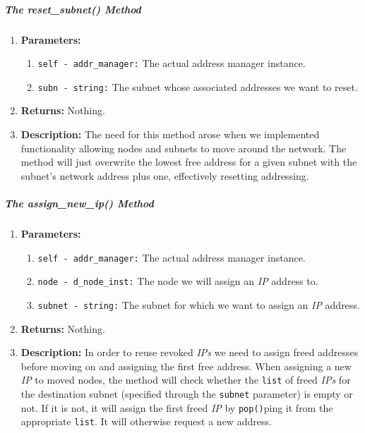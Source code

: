         \subparagraph{The reset\_subnet() Method}
            \begin{enumerate}
                \item \textbf{Parameters:}
                \begin{enumerate}
                    \item \texttt{self - addr\_manager:} The actual address manager instance.
                    \item \texttt{subn - string:} The subnet whose associated addresses we want to reset.
                \end{enumerate}
                \item \textbf{Returns:} Nothing.
                \item \textbf{Description:} The need for this method arose when we implemented functionality allowing nodes and subnets to move around the network. The method will just overwrite the lowest free address for a given subnet with the subnet's network address plus one, effectively resetting addressing.
            \end{enumerate}

        \subparagraph{The assign\_new\_ip() Method}
            \begin{enumerate}
                \item \textbf{Parameters:}
                \begin{enumerate}
                    \item \texttt{self - addr\_manager:} The actual address manager instance.
                    \item \texttt{node - d\_node\_inst:} The node we will assign an \textit{IP} address to.
                    \item \texttt{subnet - string:} The subnet for which we want to assign an \textit{IP} address.
                \end{enumerate}
                \item \textbf{Returns:} Nothing.
                \item \textbf{Description:} In order to reuse revoked \textit{IPs} we need to assign freed addresses before moving on and assigning the first free address. When assigning a new \textit{IP} to moved nodes, the method will check whether the \texttt{list} of freed \textit{IPs} for the destination subnet (specified through the \texttt{subnet} parameter) is empty or not. If it is not, it will assign the first freed \textit{IP} by \texttt{pop()}ping \cite{bib:python-datastructures} it from the appropriate \texttt{list}. It will otherwise request a new address.
            \end{enumerate}
